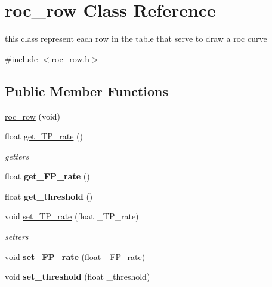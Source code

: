 \hypertarget{classroc__row}{
\section{roc\_\-row Class Reference}
\label{classroc__row}
}


this class represent each row in the table that serve to draw a roc curve  




{\ttfamily \#include $<$roc\_\-row.h$>$}

\subsection*{Public Member Functions}
\begin{DoxyCompactItemize}
\item 
\hyperlink{classroc__row_a32d80345c872db5e19519ff7e8c93cb9}{roc\_\-row} (void)
\item 
\hypertarget{classroc__row_ae24fed7657ac0af7cda70dd2d86133d4}{
float \hyperlink{classroc__row_ae24fed7657ac0af7cda70dd2d86133d4}{get\_\-TP\_\-rate} ()}
\label{classroc__row_ae24fed7657ac0af7cda70dd2d86133d4}

\begin{DoxyCompactList}\small\item\em getters \end{DoxyCompactList}\item 
\hypertarget{classroc__row_aa9cbf67343e9f2bae45bdebe52acbc8f}{
float {\bfseries get\_\-FP\_\-rate} ()}
\label{classroc__row_aa9cbf67343e9f2bae45bdebe52acbc8f}

\item 
\hypertarget{classroc__row_ae121af287561b1317c6922640eb2e10c}{
float {\bfseries get\_\-threshold} ()}
\label{classroc__row_ae121af287561b1317c6922640eb2e10c}

\item 
\hypertarget{classroc__row_ae4342cf829a6e2fb76d1bfbc38fef240}{
void \hyperlink{classroc__row_ae4342cf829a6e2fb76d1bfbc38fef240}{set\_\-TP\_\-rate} (float \_\-TP\_\-rate)}
\label{classroc__row_ae4342cf829a6e2fb76d1bfbc38fef240}

\begin{DoxyCompactList}\small\item\em setters \end{DoxyCompactList}\item 
\hypertarget{classroc__row_a63520ce5b89da78705d16d3a59b0a75a}{
void {\bfseries set\_\-FP\_\-rate} (float \_\-FP\_\-rate)}
\label{classroc__row_a63520ce5b89da78705d16d3a59b0a75a}

\item 
\hypertarget{classroc__row_a9543efede67be3210b25d981bb45dc16}{
void {\bfseries set\_\-threshold} (float \_\-threshold)}
\label{classroc__row_a9543efede67be3210b25d981bb45dc16}

\end{DoxyCompactItemize}


